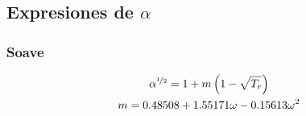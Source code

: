 \subsection{Expresiones de $\alpha$}

\subsubsection{Soave\cite{soave}}

\begin{gather}
	\alpha^{\nicefrac{1}{2}} = 1 + m \left(1-\sqrt{T_r}\right)\\
	m = 0.48508+1.55171\omega-0.15613\omega^2
\end{gather}
